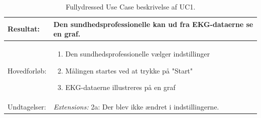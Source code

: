 \begin{table}[H]
\begin{tabularx}{\textwidth}{l X}
     Resultat:              & 	Den sundhedsprofessionelle kan ud fra EKG-dataerne se en graf.                                                                                                                                                                                                                                                                                                                                                                                                                                                                                                                                                   \\ \midrule \addlinespace[1mm]                                                                                                                                                       
     Hovedforløb:           &  \begin{enumerate}
     						   \item Den sundhedsprofessionelle vælger indstillinger
\newline						[Extension 2a: Den sundhedsprofessioneller er tilfreds med default-indstillingerne]
     						   \item Målingen startes ved at trykke på "Start"
		   				   	   \item EKG-dataerne illustreres på en graf
     						   \end{enumerate}
\\ \midrule 
 	Undtagelser:           & \textit{Extensions:}
\newline					 2a: Der blev ikke ændret i indstillingerne. 
\\ \bottomrule
    \end{tabularx}
    \caption {Fullydressed Use Case beskrivelse af UC1.}
    \label{tab:UC1}
\end{table}




